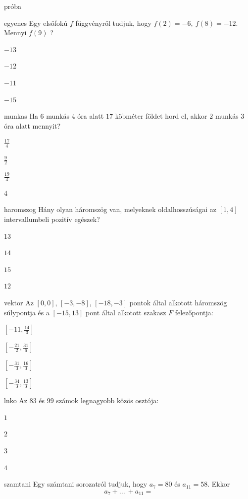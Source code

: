 \documentclass[12pt]{article}
\begin{document}
\begin{quiz}{próba}

\begin{multi}{egyenes}
Egy elsőfokú $f$ függvényről tudjuk, hogy $f(2)=-6,\ f(8)=-12$. Mennyi $f(9)$ ?
\item* $-13$
\item  $-12$
\item  $-11$
\item  $-15$
\end{multi}
\begin{multi}{munkas}
Ha $6$ munkás $4$ óra alatt $17$ köbméter földet hord el, akkor
$2$ munkás $3$ óra alatt mennyit? 

\item* $\frac{17}{4}$
\item  $\frac{9}{2}$
\item  $\frac{19}{4}$
\item  $4$
\end{multi}
\begin{multi}{haromszog}
Hány olyan háromszög van, melyeknek oldalhosszúságai az $[1,4]$ 
intervallumbeli pozitív egészek?
\item* $13$
\item  $14$
\item  $15$
\item  $12$
\end{multi}
\begin{multi}{vektor}
Az $\left[0, 0\right]$, $\left[-3, -8\right]$, $\left[-18, -3\right]$ pontok által alkotott háromszög súlypontja és a $\left[-15, 13\right]$ pont 
által alkotott szakasz $F$ felezőpontja:
\item* $\left[-11, \frac{14}{3}\right]$
\item  $\left[-\frac{21}{2}, \frac{31}{6}\right]$
\item  $\left[-\frac{31}{3}, \frac{16}{3}\right]$
\item  $\left[-\frac{34}{3}, \frac{13}{3}\right]$
\end{multi}
\begin{multi}{lnko}
Az $83$ és $99$ számok legnagyobb közös osztója:
\item* $1$
\item  $2$
\item  $3$
\item  $4$
\end{multi}
\begin{multi}{szamtani}
Egy számtani sorozatról tudjuk, hogy $a_{7}=80$ és $a_{11}=58$. Ekkor 
$$
a_{7}+{...\:} +a_{11}=
$$

\end{multi}
\end{quiz}
\end{document}
